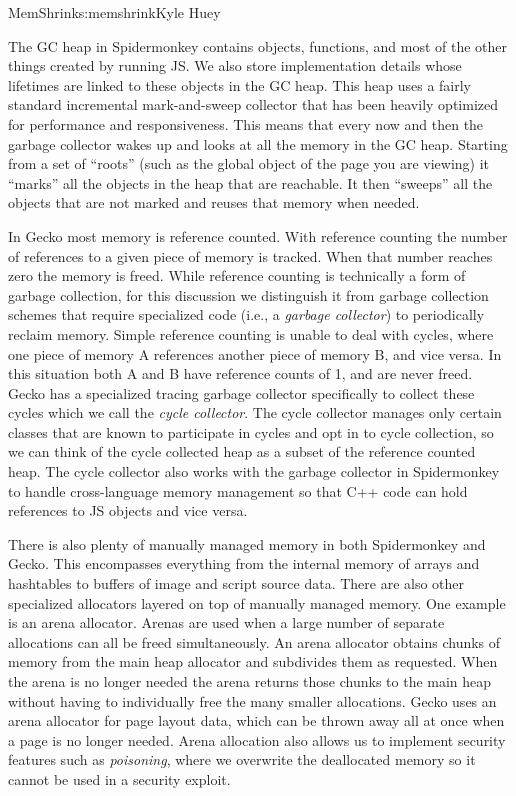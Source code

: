 \begin{aosachapter}{MemShrink}{s:memshrink}{Kyle Huey}

The GC heap in Spidermonkey contains objects, functions, and most of the
other things created by running JS. We also store implementation details
whose lifetimes are linked to these objects in the GC heap. This heap
uses a fairly standard incremental mark-and-sweep collector that has
been heavily optimized for performance and responsiveness. This means
that every now and then the garbage collector wakes up and looks at all
the memory in the GC heap. Starting from a set of ``roots'' (such as the
global object of the page you are viewing) it ``marks'' all the objects
in the heap that are reachable. It then ``sweeps'' all the objects that
are not marked and reuses that memory when needed.

In Gecko most memory is reference counted. With reference counting the
number of references to a given piece of memory is tracked. When that
number reaches zero the memory is freed. While reference counting is
technically a form of garbage collection, for this discussion we
distinguish it from garbage collection schemes that require specialized
code (i.e., a \emph{garbage collector}) to periodically reclaim memory.
Simple reference counting is unable to deal with cycles, where one piece
of memory A references another piece of memory B, and vice versa. In
this situation both A and B have reference counts of 1, and are never
freed. Gecko has a specialized tracing garbage collector specifically to
collect these cycles which we call the \emph{cycle collector}. The cycle
collector manages only certain classes that are known to participate in
cycles and opt in to cycle collection, so we can think of the cycle
collected heap as a subset of the reference counted heap. The cycle
collector also works with the garbage collector in Spidermonkey to
handle cross-language memory management so that C++ code can hold
references to JS objects and vice versa.

There is also plenty of manually managed memory in both Spidermonkey and
Gecko. This encompasses everything from the internal memory of arrays
and hashtables to buffers of image and script source data. There are
also other specialized allocators layered on top of manually managed
memory. One example is an arena allocator. Arenas are used when a large
number of separate allocations can all be freed simultaneously. An arena
allocator obtains chunks of memory from the main heap allocator and
subdivides them as requested. When the arena is no longer needed the
arena returns those chunks to the main heap without having to
individually free the many smaller allocations. Gecko uses an arena
allocator for page layout data, which can be thrown away all at once
when a page is no longer needed. Arena allocation also allows us to
implement security features such as \emph{poisoning}, where we overwrite
the deallocated memory so it cannot be used in a security exploit.


\end{aosachapter}

